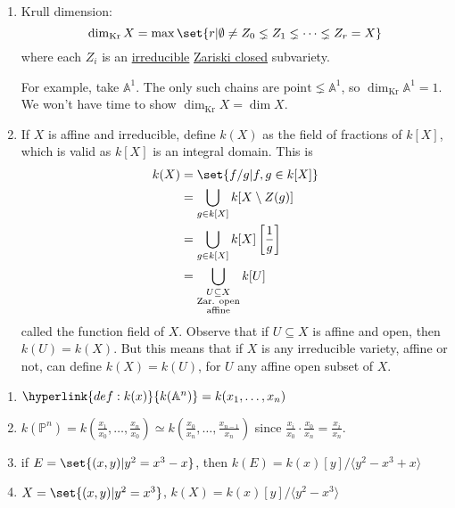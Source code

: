 \documentclass{article}
\newcommand{\A}{\mathbb{A}}
\newcommand{\proj}{\mathbb{P}}
\newcommand{\krdim}{\dim_{\text{Kr}}}
\begin{document}
\begin{enumerate}[label=(\arabic*)]
    \item Krull dimension:
        \begin{equation*}
            \krdim X = \max\set{r | \emptyset \neq Z_0 \lneq Z_1 \lneq \dotsb \lneq Z_r = X}
        \end{equation*}
        where each $Z_i$ is an \hyperlink{def:reducible}{irreducible} \hyperlink{def:zariski}{Zariski closed} subvariety.

        For example, take $\A^1$. The only such chains are $\text{point} \lneq \A^1$, so $\krdim \A^1 = 1$.
        We won't have time to show $\krdim X = \dim X$.
    \item If $X$ is affine and irreducible, define \hypertarget{def:k(x)}{$k(X)$} as the field of fractions of \hyperlink{def:kx}{$k[X]$}, which is valid as $k[X]$ is an integral domain.
        This is
        \begin{align*}
            k(X) &= \set{f/g | f, g \in k[X]} \\
                 &= \bigcup_{g \in k[X]} k[X \setminus Z(g)] \\
                 &= \bigcup_{g \in k[X]} k[X]\left[\frac{1}{g}\right] \\
                 &= \bigcup_{\substack{U \subseteq X \\\text{Zar. open}\\\text{affine}}} k[U]
        \end{align*}
        called the function field of $X$.
        Observe that if $U \subseteq X$ is affine and open, then $k(U) = k(X)$.
        But this means that if $X$ is any irreducible variety, affine or not, can define $k(X) = k(U)$, for $U$ any affine open subset of $X$.
\end{enumerate}
\begin{eg}\leavevmode
    \begin{enumerate}[label=(\roman*)]
        \item $\hyperlink{def:k(x)}{k(\A^n)} = k(x_1, \dotsc, x_n)$
        \item $k(\proj^n) = k(\frac{x_1}{x_0}, \dotsc, \frac{x_n}{x_0}) \simeq k(\frac{x_0}{x_n}, \dotsc, \frac{x_{n-1}}{x_n})$ since $\frac{x_i}{x_0} \cdot \frac{x_0}{x_n} = \frac{x_i}{x_n}$.
        \item if $E = \set{(x, y) | y^2 = x^3 - x}$, then $k(E) = k(x)[y]/\langle y^2 - x^3 + x \rangle$
        \item $X = \set{(x, y) | y^2 = x^3}$, $k(X) = k(x)[y] / \langle y^2 - x^3 \rangle$
    \end{enumerate}
\end{eg}
\end{document}
